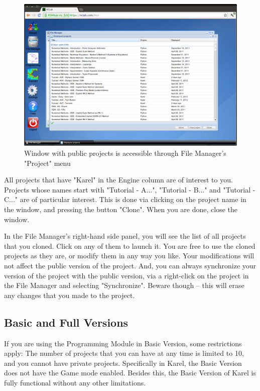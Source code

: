 \documentclass[article,A4,12pt]{llncs}
\begin{document}
\begin{figure}[!ht]
\begin{center}
\includegraphics[width=\textwidth]{img/cloning.png}
\end{center}
\caption{Window with public projects is accessible through File Manager's "Project" menu}
\label{fig:cloning}
\end{figure}
\noindent
All projects that have "Karel" in the Engine column are of interest to you. 
Projects whose names start with "Tutorial - A...", "Tutorial - B..." and 
"Tutorial - C..." are of particular interest. This is done via clicking on the project 
name in the window, and pressing the button "Clone". When you are done, close the 
window. 

In the File Manager's right-hand side panel, you will see the list of all 
projects that you cloned. Click on any of them to launch it. You are free to 
use the cloned projects as they are, or modify them in any way you like. Your modifications 
will not affect the public version of the project. And, you can 
always synchronize your version of the project with the public version, via 
a right-click on the project in the File Manager and selecting "Synchronize".
Beware though -- this will erase any changes that you made to the project.

\subsection{Basic and Full Versions}

If you are using the Programming Module in Basic Version, some restrictions apply: The 
number of projects that you can have at any time is limited to 10, and you cannot have
private projects. Specifically in Karel, the Basic Version does not have the Game mode 
enabled. Besides this, the Basic Version of Karel is fully functional without any other 
limitations. 
\end{document}
